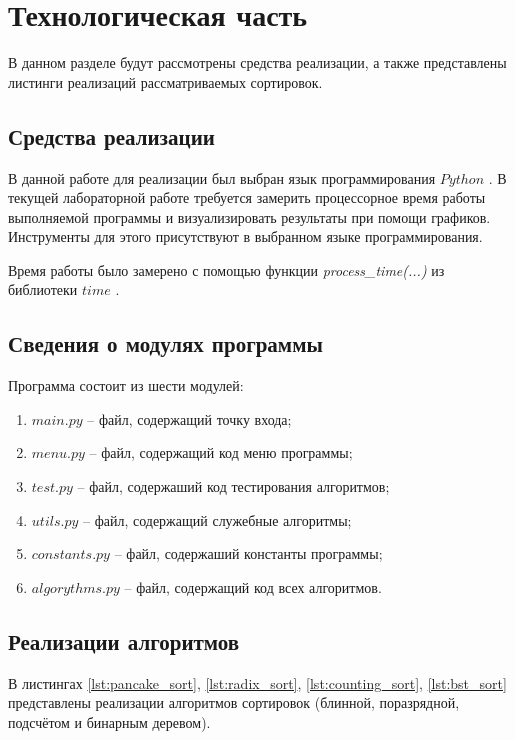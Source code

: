 \chapter{Технологическая часть}

В данном разделе будут рассмотрены средства реализации, а также представлены листинги реализаций рассматриваемых сортировок.

\section{Средства реализации}
В данной работе для реализации был выбран язык программирования $Python$ \cite{python-lang}. В текущей лабораторной работе требуется замерить процессорное время работы выполняемой программы
и визуализировать результаты при помощи графиков. Инструменты для этого присутствуют в выбранном языке программирования.

Время работы было замерено с помощью функции \textit{process\_time(...)} из библиотеки $time$ \cite{python-lang-time}.

\section{Сведения о модулях программы}
Программа состоит из шести модулей:
\begin{enumerate}[label=\arabic*)]
	\item $main.py$ -- файл, содержащий точку входа;
	\item $menu.py$ -- файл, содержащий код меню программы;
	\item $test.py$ -- файл, содержаший код тестирования алгоритмов;
	\item $utils.py$ -- файл, содержащий служебные алгоритмы;
	\item $constants.py$ -- файл, содержаший константы программы;
	\item $algorythms.py$ -- файл, содержащий код всех алгоритмов. \newline
\end{enumerate}


\section{Реализации алгоритмов}

В листингах \ref{lst:pancake_sort}, \ref{lst:radix_sort}, \ref{lst:counting_sort}, \ref{lst:bst_sort} представлены реализации алгоритмов сортировок (блинной, поразрядной, подсчётом и бинарным деревом). \clearpage

